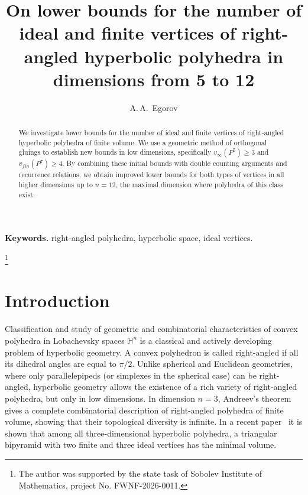 \documentclass[12pt]{amsart}
\theoremstyle{definition}
\begin{document}
	
	\author{A.\,A.~Egorov}
	\address{Sobolev Institute of Mathematics, Siberian Branch of Russian Academy of Sciences, Novosibirsk,	Russia} 
	
	\title[Lower bounds for right-angled hyperbolic polyhedra]{On lower bounds for the number of ideal and finite vertices of right-angled hyperbolic polyhedra in dimensions from 5 to 12}
	
	\maketitle 
	
	\begin{abstract}
		We investigate lower bounds for the number of ideal and finite vertices of right-angled hyperbolic polyhedra of finite volume. We use a geometric method of orthogonal gluings to establish new bounds in low dimensions, specifically  $v_\infty(P^5) \ge 3$ and $v_{fin}(P^7) \ge 4$. By combining these initial bounds with double counting arguments and recurrence relations, we obtain improved lower bounds for both types of vertices in all higher dimensions up to $n=12$, the maximal dimension where polyhedra of this class exist.
	\end{abstract}
	
	\smallskip
	\noindent \textbf{Keywords.} right-angled polyhedra, hyperbolic space, ideal vertices.
	
	\let\thefootnote\relax\footnote{The author was supported by the state task of Sobolev Institute of Mathematics, project No. FWNF-2026-0011.}
	
	\section{Introduction}
	
	Classification and study of geometric and combinatorial characteristics of convex polyhedra in Lobachevsky spaces $\mathbb{H}^n$ is a classical and actively developing problem of hyperbolic geometry. A convex polyhedron is called right-angled if all its dihedral angles are equal to $\pi/2$. Unlike spherical and Euclidean geometries, where only parallelepipeds (or simplexes in the spherical case) can be right-angled, hyperbolic geometry allows the existence of a rich variety of right-angled polyhedra, but only in low dimensions. In dimension $n=3$, Andreev's theorem~\cite{And70,And70_2} gives a complete combinatorial description of right-angled polyhedra of finite volume, showing that their topological diversity is infinite. In a recent paper~\cite{EV2025} it is shown that among all three-dimensional hyperbolic polyhedra, a triangular bipyramid with two finite and three ideal vertices has the minimal volume.
	
\end{document}
